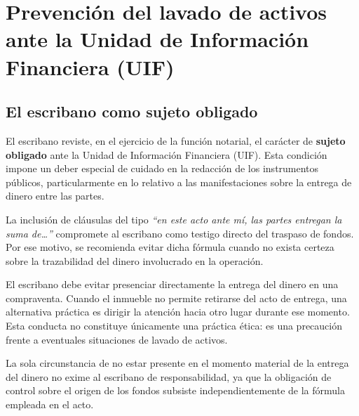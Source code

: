 \documentclass[12pt,oneside]{book}
\begin{document}
\tableofcontents


\chapter{Prevención del lavado de activos ante la Unidad de Información Financiera (UIF)}

\section{El escribano como sujeto obligado}

El escribano reviste, en el ejercicio de la función notarial, el carácter de \textbf{sujeto obligado} ante la Unidad de Información Financiera (UIF). Esta condición impone un deber especial de cuidado en la redacción de los instrumentos públicos, particularmente en lo relativo a las manifestaciones sobre la entrega de dinero entre las partes.

La inclusión de cláusulas del tipo \textit{``en este acto ante mí, las partes entregan la suma de\dots''} compromete al escribano como testigo directo del traspaso de fondos. Por ese motivo, se recomienda evitar dicha fórmula cuando no exista certeza sobre la trazabilidad del dinero involucrado en la operación.

\begin{important}
El escribano debe evitar presenciar directamente la entrega del dinero en una compraventa. Cuando el inmueble no permite retirarse del acto de entrega, una alternativa práctica es dirigir la atención hacia otro lugar durante ese momento. Esta conducta no constituye únicamente una práctica ética: es una precaución frente a eventuales situaciones de lavado de activos.
\end{important}

\begin{note}
La sola circunstancia de no estar presente en el momento material de la entrega del dinero no exime al escribano de responsabilidad, ya que la obligación de control sobre el origen de los fondos subsiste independientemente de la fórmula empleada en el acto.
\end{note}
\end{document}
